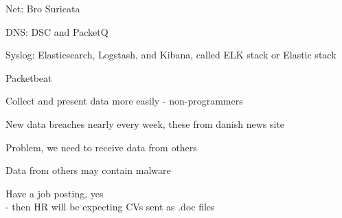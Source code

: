 \documentclass[Screen16to9,17pt]{foils}
\begin{document}

\begin{list2}
\item
\item
\end{list2}


\begin{list1}
\item Net: Bro  Suricata 
\item DNS: DSC and PacketQ 
\item Syslog: Elasticsearch, Logstash, and Kibana, called ELK stack or Elastic stack
\item Packetbeat 
\end{list1}
\centerline{Collect and present data more easily - non-programmers}




\slide{}

\begin{list2}
\item
\item
\end{list2}
\slide{}

\begin{list2}
\item
\item
\end{list2}



\begin{list2}
\item
\item
\end{list2}



New data breaches nearly every week, these from danish news site 

Problem, we need to receive data from others

Data from others may contain malware

Have a job posting, yes\\
- then HR will be expecting CVs sent as .doc files
\end{document}

